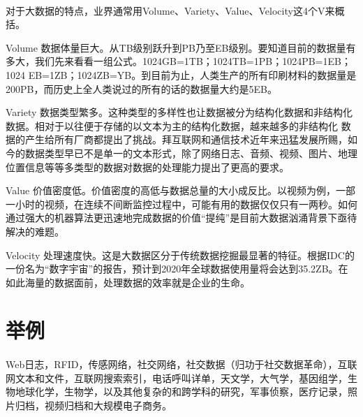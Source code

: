 \documentclass[12pt]{article}
\begin{document}
\paragraph{}
对于大数据的特点，业界通常用Volume、Variety、Value、Velocity这4个V来概括。

\begin{description}
\item{Volume}
数据体量巨大。从TB级别跃升到PB乃至EB级别。要知道目前的数据量有多大，我们先来看看一组公式。1024GB=1TB；1024TB=1PB；1024PB=1EB；1024 EB=1ZB；1024ZB=YB。到目前为止，人类生产的所有印刷材料的数据量是200PB，而历史上全人类说过的所有的话的数据量大约是5EB。

\item{Variety}
数据类型繁多。这种类型的多样性也让数据被分为结构化数据和非结构化数据。相对于以往便于存储的以文本为主的结构化数据，越来越多的非结构化 数据的产生给所有厂商都提出了挑战。拜互联网和通信技术近年来迅猛发展所赐，如今的数据类型早已不是单一的文本形式，除了网络日志、音频、视频、图片、地理位置信息等等多类型的数据对数据的处理能力提出了更高的要求。

\item{Value}
价值密度低。价值密度的高低与数据总量的大小成反比。以视频为例，一部一小时的视频，在连续不间断监控过程中，可能有用的数据仅仅只有一两秒。如何通过强大的机器算法更迅速地完成数据的价值“提纯”是目前大数据汹涌背景下亟待解决的难题。

\item{Velocity}
处理速度快。这是大数据区分于传统数据挖掘最显著的特征。根据IDC的一份名为“数字宇宙”的报告，预计到2020年全球数据使用量将会达到35.2ZB。在如此海量的数据面前，处理数据的效率就是企业的生命。

\end{description}

\newpage

\section{举例}
\paragraph{}
Web日志，RFID，传感网络，社交网络，社交数据（归功于社交数据革命），互联网文本和文件，互联网搜索索引，电话呼叫详单，天文学，大气学，基因组学，生物地球化学，生物学，以及其他复杂的和跨学科的研究，军事侦察，医疗记录，照片归档，视频归档和大规模电子商务。
\end{document}

